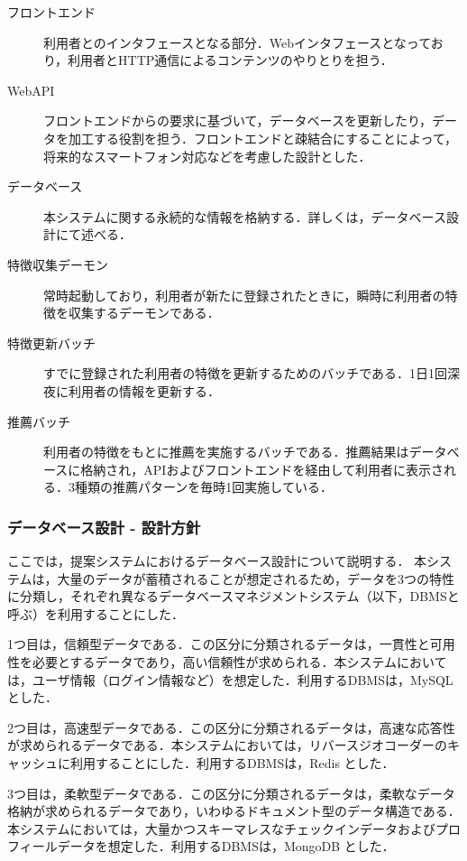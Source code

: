 \documentclass{jsarticle}
\begin{document}
\begin{description}
\item[フロントエンド] 利用者とのインタフェースとなる部分．Webインタフェースとなっており，利用者とHTTP通信によるコンテンツのやりとりを担う．
\item[WebAPI] フロントエンドからの要求に基づいて，データベースを更新したり，データを加工する役割を担う．フロントエンドと疎結合にすることによって，将来的なスマートフォン対応などを考慮した設計とした．
\item[データベース] 本システムに関する永続的な情報を格納する．詳しくは，データベース設計にて述べる．
\item[特徴収集デーモン] 常時起動しており，利用者が新たに登録されたときに，瞬時に利用者の特徴を収集するデーモンである．
\item[特徴更新バッチ] すでに登録された利用者の特徴を更新するためのバッチである．1日1回深夜に利用者の情報を更新する．
\item[推薦バッチ] 利用者の特徴をもとに推薦を実施するバッチである．推薦結果はデータベースに格納され，APIおよびフロントエンドを経由して利用者に表示される．3種類の推薦パターンを毎時1回実施している．
\end{description}


\subsubsection{データベース設計 - 設計方針}

ここでは，提案システムにおけるデータベース設計について説明する．
本システムは，大量のデータが蓄積されることが想定されるため，データを3つの特性に分類し，それぞれ異なるデータベースマネジメントシステム（以下，DBMSと呼ぶ）を利用することにした．

1つ目は，信頼型データである．この区分に分類されるデータは，一貫性と可用性を必要とするデータであり，高い信頼性が求められる．本システムにおいては，ユーザ情報（ログイン情報など）を想定した．利用するDBMSは，MySQL とした．

2つ目は，高速型データである．この区分に分類されるデータは，高速な応答性が求められるデータである．本システムにおいては，リバースジオコーダーのキャッシュに利用することにした．利用するDBMSは，Redis とした．

3つ目は，柔軟型データである．この区分に分類されるデータは，柔軟なデータ格納が求められるデータであり，いわゆるドキュメント型のデータ構造である．本システムにおいては，大量かつスキーマレスなチェックインデータおよびプロフィールデータを想定した．利用するDBMSは，MongoDB とした．
\end{document}
